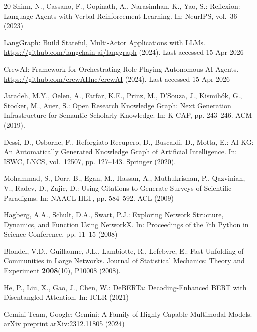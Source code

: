 \begin{thebibliography}{20}
Shinn, N., Cassano, F., Gopinath, A., Narasimhan, K., Yao, S.: Reflexion: Language Agents with Verbal Reinforcement Learning. In: NeurIPS, vol.~36 (2023)

LangGraph: Build Stateful, Multi-Actor Applications with LLMs. \url{https://github.com/langchain-ai/langgraph} (2024). Last accessed 15 Apr 2026

CrewAI: Framework for Orchestrating Role-Playing Autonomous AI Agents. \url{https://github.com/crewAIInc/crewAI} (2024). Last accessed 15 Apr 2026

Jaradeh, M.Y., Oelen, A., Farfar, K.E., Prinz, M., D'Souza, J., Kismih\'{o}k, G., Stocker, M., Auer, S.: Open Research Knowledge Graph: Next Generation Infrastructure for Semantic Scholarly Knowledge. In: K-CAP, pp. 243--246. ACM (2019). 

Dessì, D., Osborne, F., Reforgiato Recupero, D., Buscaldi, D., Motta, E.: AI-KG: An Automatically Generated Knowledge Graph of Artificial Intelligence. In: ISWC, LNCS, vol.~12507, pp. 127--143. Springer (2020). 

Mohammad, S., Dorr, B., Egan, M., Hassan, A., Muthukrishan, P., Qazvinian, V., Radev, D., Zajic, D.: Using Citations to Generate Surveys of Scientific Paradigms. In: NAACL-HLT, pp. 584--592. ACL (2009)

Hagberg, A.A., Schult, D.A., Swart, P.J.: Exploring Network Structure, Dynamics, and Function Using NetworkX. In: Proceedings of the 7th Python in Science Conference, pp. 11--15 (2008)

Blondel, V.D., Guillaume, J.L., Lambiotte, R., Lefebvre, E.: Fast Unfolding of Communities in Large Networks. Journal of Statistical Mechanics: Theory and Experiment \textbf{2008}(10), P10008 (2008). 

He, P., Liu, X., Gao, J., Chen, W.: DeBERTa: Decoding-Enhanced BERT with Disentangled Attention. In: ICLR (2021)

Gemini Team, Google: Gemini: A Family of Highly Capable Multimodal Models. arXiv preprint arXiv:2312.11805 (2024)

\end{thebibliography}


